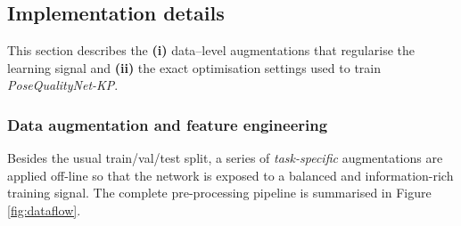 \documentclass{article}
\begin{document}
\subsection{Implementation details}
\label{sec:impl}

This section describes the \textbf{(i)} data–level augmentations that
regularise the learning signal and \textbf{(ii)} the exact optimisation
settings used to train \textit{PoseQualityNet-KP}.  

\subsubsection{Data augmentation and feature engineering}
\label{sec:aug}

Besides the usual train/val/test split, a series of \emph{task-specific}
augmentations are applied off-line so that the network is exposed to a
balanced and information-rich training signal.
The complete pre-processing pipeline is summarised in
Figure \ref{fig:dataflow}.
\end{document}
